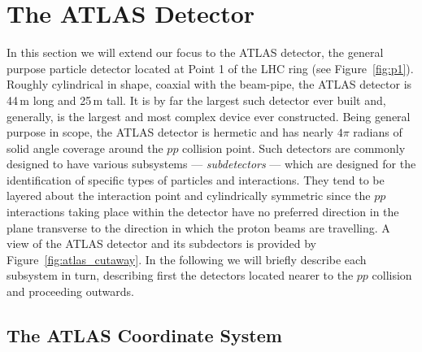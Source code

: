 \section{The ATLAS Detector}
\label{sec:atlas}

In this section we will extend our focus to the ATLAS detector, the general purpose
particle detector located at Point 1 of the LHC ring (see Figure~\ref{fig:p1}).
Roughly cylindrical in shape, coaxial with the beam-pipe,
the ATLAS detector is 44\,m long and 25\,m tall.
It is by far the largest such detector ever built and,
generally, is the largest and most complex device ever constructed.
Being general purpose in scope, the ATLAS detector is hermetic and has
nearly $4\pi$ radians of solid angle coverage around the $pp$ collision
point. 
Such detectors are commonly designed to have various subsystems --- \textit{subdetectors} ---
which are designed for the identification of specific types of particles
and interactions.
They tend to be layered about the interaction point and cylindrically symmetric
since the $pp$ interactions taking place within the detector have no preferred
direction in the plane transverse to the direction in which the proton beams
are travelling.
A view of the ATLAS detector and its subdectors is provided by Figure~\ref{fig:atlas_cutaway}.
In the following we will briefly describe each subsystem in turn, describing
first the detectors located nearer to the $pp$ collision and proceeding outwards.

\subsection{The ATLAS Coordinate System}
\label{sec:atlas_coordinate_system}

